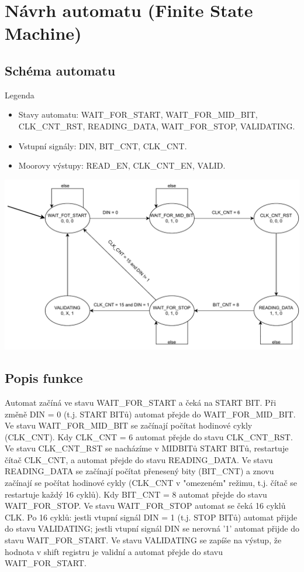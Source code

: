 \documentclass[a4paper, 11pt]{article}
\begin{document}
\newpage
\section{Návrh automatu (Finite State Machine)}
\subsection{Schéma automatu}
Legenda
\begin{itemize}
  \item Stavy automatu: WAIT\_FOR\_START, WAIT\_FOR\_MID\_BIT, CLK\_CNT\_RST, READING\_DATA, WAIT\_FOR\_STOP, VALIDATING.
  \item Vstupní signály: DIN, BIT\_CNT, CLK\_CNT.
  \item Moorovy výstupy: READ\_EN, CLK\_CNT\_EN, VALID.
\end{itemize}
\includegraphics[width=\textwidth,height=\textheight,keepaspectratio]{INC_FSM.pdf}
\subsection{Popis funkce}
Automat začíná ve stavu WAIT\_FOR\_START a čeká na START BIT. Při změně {DIN = 0} (t.j. START BITů) automat přejde do WAIT\_FOR\_MID\_BIT. Ve stavu WAIT\_FOR\_MID\_BIT se začínají počítat hodinové cykly (CLK\_CNT). Kdy CLK\_CNT = 6 automat přejde do stavu CLK\_CNT\_RST. Ve stavu CLK\_CNT\_RST se nacházíme v MIDBITů START BITů, restartuje čítač CLK\_CNT, a automat přejde do stavu READING\_DATA. Ve stavu READING\_DATA se začínají počítat přenesený bity (BIT\_CNT) a znovu začínají se počítat hodinové cykly  (CLK\_CNT v "omezeném" režimu, t.j. čítač se restartuje každý 16 cyklů). Kdy BIT\_CNT = 8 automat přejde do stavu WAIT\_FOR\_STOP. Ve stavu WAIT\_FOR\_STOP automat se čeká 16 cyklů CLK. Po 16 cyklů: jestli vtupní signál DIN = 1 (t.j. STOP BITů) automat přijde do stavu VALIDATING; jestli vtupní signál DIN se nerovná '1' automat přijde do stavu WAIT\_FOR\_START. Ve stavu VALIDATING se zapíše na výstup, že  hodnota v shift registru je validní a automat přejde do stavu WAIT\_FOR\_START.
\newpage
\end{document}
